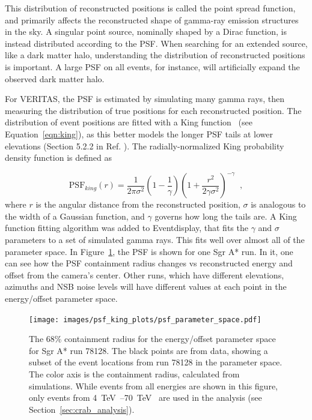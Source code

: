     This distribution of reconstructed positions is called the point spread function, and primarily affects the reconstructed shape of gamma-ray emission structures in the sky.
    A singular point source, nominally shaped by a Dirac function, is instead distributed according to the PSF.
    When searching for an extended source, like a dark matter halo, understanding the distribution of reconstructed positions is important.
    A large PSF on all events, for instance, will artificially expand the observed dark matter halo.

    For VERITAS, the PSF is estimated by simulating many gamma rays, then measuring the distribution of true positions for each reconstructed position.
    The distribution of event positions are fitted with a King function~\cite{king1962} (see Equation~\ref{eqn:king}), as this better models the longer PSF tails at lower elevations (Section 5.2.2 in Ref. \cite{Mayer2015}).
    The radially-normalized King probability density function is defined as

    \begin{equation} \label{eqn:king}
    \text{PSF}_{king}(r) = \frac{1}{2 \pi \sigma^{2} } \left( 1 - \frac{1}{\gamma} \right) \left( 1 + \frac{ r^{2} }{ 2 \gamma \sigma^{2} } \right)^{-\gamma} \;\;,
    \end{equation}
    where $r$ is the angular distance from the reconstructed position, $\sigma$ is analogous to the width of a Gaussian function, and $\gamma$ governs how long the tails are.
    A King function fitting algorithm was added to Eventdisplay, that fits the $\gamma$ and $\sigma$ parameters to a set of simulated gamma rays.
    This fits well over almost all of the parameter space.
    In Figure~\ref{fig:psf_paramspace}, the PSF is shown for one Sgr A* run.
    In it, one can see how the PSF containment radius changes vs reconstructed energy and offset from the camera's center.
    Other runs, which have different elevations, azimuths and NSB noise levels will have different values at each point in the energy/offset parameter space.

    \begin{figure}[!ht]
      \centering
      \texttt{[image: images/psf\_king\_plots/psf\_parameter\_space.pdf]}
      \caption[PSF Parameter Space]{
        The 68\% containment radius for the energy/offset parameter space for Sgr A* run 78128. 
        The black points are from data, showing a subset of the event locations from run 78128 in the parameter space.
        The color axis is the containment radius, calculated from simulations.
        While events from all energies are shown in this figure, only events from \SIrange{4}{70}{\TeV{}} are used in the analysis (see Section~\ref{sec:crab_analysis}).
      }
      \label{fig:psf_paramspace}
    \end{figure}

